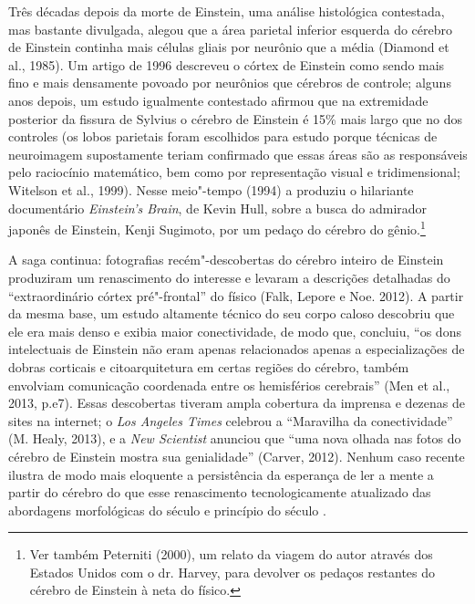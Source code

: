 Três décadas depois da morte de Einstein, uma análise histológica
contestada, mas bastante divulgada, alegou que a área parietal inferior
esquerda do cérebro de Einstein continha mais células gliais por
neurônio que a média (Diamond et al., 1985). Um artigo de 1996 descreveu
o córtex de Einstein como sendo mais fino e mais densamente povoado por
neurônios que cérebros de controle; alguns anos depois, um estudo
igualmente contestado afirmou que na extremidade posterior da fissura de
Sylvius o cérebro de Einstein é 15\% mais largo que no dos controles (os
lobos parietais foram escolhidos para estudo porque técnicas de
neuroimagem supostamente teriam confirmado que essas áreas são as
responsáveis pelo raciocínio matemático, bem como por representação
visual e tridimensional; Witelson et al., 1999). Nesse meio"-tempo (1994)
a  produziu o hilariante documentário \emph{Einstein's Brain}, de
Kevin Hull, sobre a busca do admirador japonês de Einstein, Kenji
Sugimoto, por um pedaço do cérebro do gênio.\footnote[11]{Ver também Peterniti (2000), um relato da viagem do autor através
dos Estados Unidos com o dr. Harvey, para devolver os pedaços restantes
do cérebro de Einstein à neta do físico.}

A saga continua: fotografias recém"-descobertas do cérebro inteiro de
Einstein produziram um renascimento do interesse e levaram a descrições
detalhadas do ``extraordinário córtex pré"-frontal'' do físico (Falk,
Lepore e Noe. 2012). A partir da mesma base, um estudo altamente técnico
do seu corpo caloso descobriu que ele era mais denso e exibia maior
conectividade, de modo que, concluiu, ``os dons intelectuais de Einstein
não eram apenas relacionados apenas a especializações de dobras
corticais e citoarquitetura em certas regiões do cérebro, também
envolviam comunicação coordenada entre os hemisférios cerebrais'' (Men
et al., 2013, p.e7). Essas descobertas tiveram ampla cobertura da
imprensa e dezenas de sites na internet; o \emph{Los Angeles Times}
celebrou a ``Maravilha da conectividade'' (M. Healy, 2013), e a
\emph{New Scientist} anunciou que ``uma nova olhada nas fotos do cérebro
de Einstein mostra sua genialidade'' (Carver, 2012). Nenhum caso recente
ilustra de modo mais eloquente a persistência da esperança de ler a
mente a partir do cérebro do que esse renascimento tecnologicamente
atualizado das abordagens morfológicas do século  e princípio do
século .

